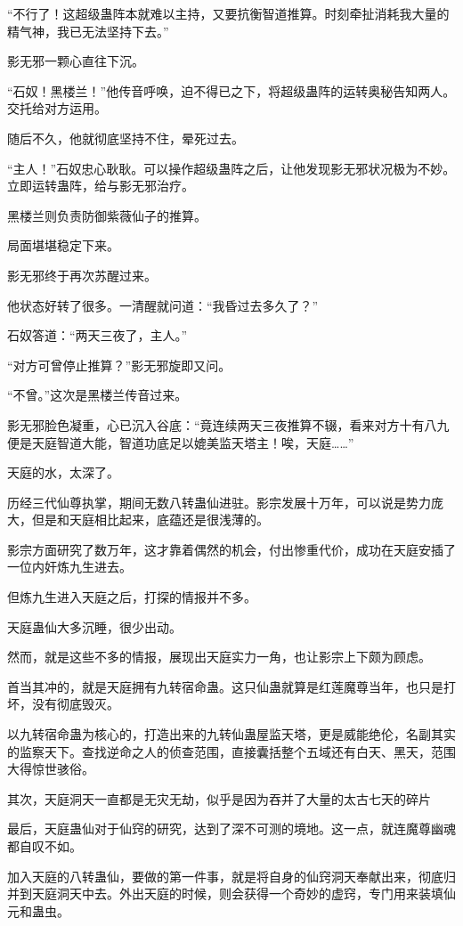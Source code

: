 \begin{this_body}
“不行了！这超级蛊阵本就难以主持，又要抗衡智道推算。时刻牵扯消耗我大量的精气神，我已无法坚持下去。”

影无邪一颗心直往下沉。

“石奴！黑楼兰！”他传音呼唤，迫不得已之下，将超级蛊阵的运转奥秘告知两人。交托给对方运用。

随后不久，他就彻底坚持不住，晕死过去。

“主人！”石奴忠心耿耿。可以操作超级蛊阵之后，让他发现影无邪状况极为不妙。立即运转蛊阵，给与影无邪治疗。

黑楼兰则负责防御紫薇仙子的推算。

局面堪堪稳定下来。

影无邪终于再次苏醒过来。

他状态好转了很多。一清醒就问道：“我昏过去多久了？”

石奴答道：“两天三夜了，主人。”

“对方可曾停止推算？”影无邪旋即又问。

“不曾。”这次是黑楼兰传音过来。

影无邪脸色凝重，心已沉入谷底：“竟连续两天三夜推算不辍，看来对方十有八九便是天庭智道大能，智道功底足以媲美监天塔主！唉，天庭……”

天庭的水，太深了。

历经三代仙尊执掌，期间无数八转蛊仙进驻。影宗发展十万年，可以说是势力庞大，但是和天庭相比起来，底蕴还是很浅薄的。

影宗方面研究了数万年，这才靠着偶然的机会，付出惨重代价，成功在天庭安插了一位内奸炼九生进去。

但炼九生进入天庭之后，打探的情报并不多。

天庭蛊仙大多沉睡，很少出动。

然而，就是这些不多的情报，展现出天庭实力一角，也让影宗上下颇为顾虑。

首当其冲的，就是天庭拥有九转宿命蛊。这只仙蛊就算是红莲魔尊当年，也只是打坏，没有彻底毁灭。

以九转宿命蛊为核心的，打造出来的九转仙蛊屋监天塔，更是威能绝伦，名副其实的监察天下。查找逆命之人的侦查范围，直接囊括整个五域还有白天、黑天，范围大得惊世骇俗。

其次，天庭洞天一直都是无灾无劫，似乎是因为吞并了大量的太古七天的碎片

最后，天庭蛊仙对于仙窍的研究，达到了深不可测的境地。这一点，就连魔尊幽魂都自叹不如。

加入天庭的八转蛊仙，要做的第一件事，就是将自身的仙窍洞天奉献出来，彻底归并到天庭洞天中去。外出天庭的时候，则会获得一个奇妙的虚窍，专门用来装填仙元和蛊虫。


\end{this_body}
